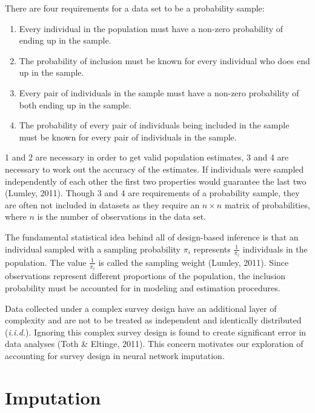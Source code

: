 \documentclass[12pt,twoside]{reedthesis}
\begin{document}
There are four requirements for a data set to be a probability sample:
\begin{enumerate}
\def\labelenumi{\arabic{enumi}.}
\item
  Every individual in the population must have a non-zero probability of
  ending up in the sample.
\item
  The probability of inclusion must be known for every individual who
  does end up in the sample.
\item
  Every pair of individuals in the sample must have a non-zero
  probability of both ending up in the sample.
\item
  The probability of every pair of individuals being included in the
  sample must be known for every pair of individuals in the sample.
\end{enumerate}
1 and 2 are necessary in order to get valid population estimates, 3 and
4 are necessary to work out the accuracy of the estimates. If
individuals were sampled independently of each other the first two
properties would guarantee the last two (Lumley, 2011). Though 3 and 4
are requirements of a probability sample, they are often not included in
datasets as they require an \(n \times n\) matrix of probabilities,
where \(n\) is the number of observations in the data set.

The fundamental statistical idea behind all of design-based inference is
that an individual sampled with a sampling probability \(\pi_i\)
represents \(\frac{1}{\pi_i}\) individuals in the population. The value
\(\frac{1}{\pi_i}\) is called the sampling weight (Lumley, 2011). Since
observations represent different proportions of the population, the
inclusion probability must be accounted for in modeling and estimation
procedures.

Data collected under a complex survey design have an additional layer of
complexity and are not to be treated as independent and identically
distributed (\emph{i.i.d.}). Ignoring this complex survey design is
found to create significant error in data analyses (Toth \& Eltinge,
2011). This concern motivates our exploration of accounting for survey
design in neural network imputation.

\section{Imputation}\label{imputation}
\end{document}
